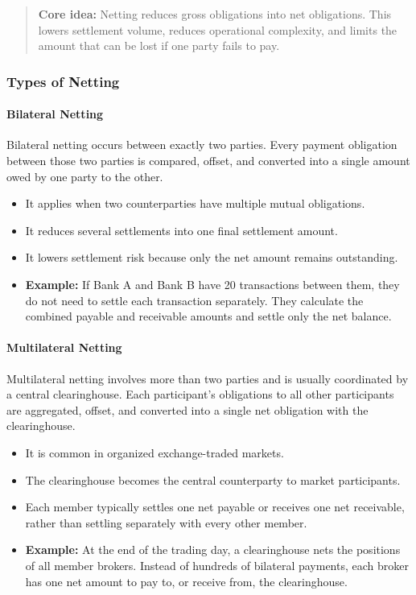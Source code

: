 \documentclass[12pt,openany]{book}
\begin{document}
\begin{quote}
\textbf{Core idea:} Netting reduces gross obligations into net obligations. This lowers settlement volume, reduces operational complexity, and limits the amount that can be lost if one party fails to pay.
\end{quote}

\subsubsection{Types of Netting}

\paragraph{Bilateral Netting}
Bilateral netting occurs between exactly two parties. Every payment obligation between those two parties is compared, offset, and converted into a single amount owed by one party to the other.

\begin{itemize}[leftmargin=*]
    \item It applies when two counterparties have multiple mutual obligations.
    \item It reduces several settlements into one final settlement amount.
    \item It lowers settlement risk because only the net amount remains outstanding.
    \item \textbf{Example:} If Bank A and Bank B have 20 transactions between them, they do not need to settle each transaction separately. They calculate the combined payable and receivable amounts and settle only the net balance.
\end{itemize}

\paragraph{Multilateral Netting}
Multilateral netting involves more than two parties and is usually coordinated by a central clearinghouse. Each participant's obligations to all other participants are aggregated, offset, and converted into a single net obligation with the clearinghouse.

\begin{itemize}[leftmargin=*]
    \item It is common in organized exchange-traded markets.
    \item The clearinghouse becomes the central counterparty to market participants.
    \item Each member typically settles one net payable or receives one net receivable, rather than settling separately with every other member.
    \item \textbf{Example:} At the end of the trading day, a clearinghouse nets the positions of all member brokers. Instead of hundreds of bilateral payments, each broker has one net amount to pay to, or receive from, the clearinghouse.
\end{itemize}
\end{document}
